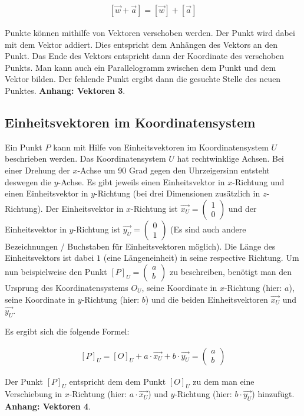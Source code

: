 \documentclass{article}
\newcommand{\m}[1]{\begin{pmatrix}#1\end{pmatrix}}
\begin{document}
    \[
        \begin{split}
            [\vec{w} + \vec{a}] = [\vec{w}] + [\vec{a}]
        \end{split}
    \]

    Punkte können mithilfe von Vektoren verschoben werden. Der Punkt wird dabei mit dem Vektor
    addiert. Dies entspricht dem Anhängen des Vektors an den Punkt. Das Ende des Vektors entspricht dann
    der Koordinate des verschoben Punkts. Man kann auch ein Parallelogramm zwischen dem Punkt und dem
    Vektor bilden. Der fehlende Punkt
    ergibt dann die gesuchte Stelle des neuen Punktes. \textbf{Anhang: Vektoren 3}.

    \subsection{Einheitsvektoren im Koordinatensystem}
    Ein Punkt $P$ kann mit Hilfe von Einheitsvektoren im Koordinatensystem $U$ beschrieben werden.
    Das Koordinatensystem $U$ hat rechtwinklige Achsen.
    Bei einer Drehung der $x$-Achse um 90 Grad gegen den Uhrzeigersinn entsteht deswegen die $y$-Achse.
    Es gibt jeweils einen Einheitsvektor in
    $x$-Richtung und einen Einheitsvektor in $y$-Richtung (bei drei Dimensionen zusätzlich in $z$-Richtung).
    Der Einheitsvektor in $x$-Richtung ist $\vec{{x}_{U}} = \m{1 \\ 0}$ und der Einheitsvektor in
    $y$-Richtung ist $\vec{{y}_{U}} = \m{0 \\ 1}$ (Es sind auch andere Bezeichnungen / Buchstaben für Einheitsvektoren
    möglich).
    Die Länge des Einheitsvektors ist dabei $1$
    (eine Längeneinheit)
    in seine respective Richtung. Um nun beispielweise den Punkt
    ${[P]}_{U} = \m{a \\ b}$ zu beschreiben, benötigt man den Ursprung des Koordinatensystems ${O}_{U}$, seine Koordinate in $x$-Richtung (hier: $a$),
    seine Koordinate in $y$-Richtung (hier: $b$) und die beiden Einheitsvektoren $\vec{{x}_{U}}$ und $\vec{{y}_{U}}$.
    
    Es ergibt sich die folgende Formel:

    \[
        \begin{split}
            {[P]}_{U} = {[O]}_{U} + a \cdot \vec{{x}_{U}} + b \cdot \vec{{y}_{U}} = \m{a \\ b}
        \end{split}
    \]

    Der Punkt ${[P]}_{U}$ entspricht dem dem Punkt ${[O]}_{U}$ zu dem man eine Verschiebung in
    $x$-Richtung (hier: $a \cdot \vec{{x}_{U}}$) und $y$-Richtung (hier: $b \cdot \vec{{y}_{U}}$) hinzufügt.
    \textbf{Anhang: Vektoren 4}.
\end{document}

